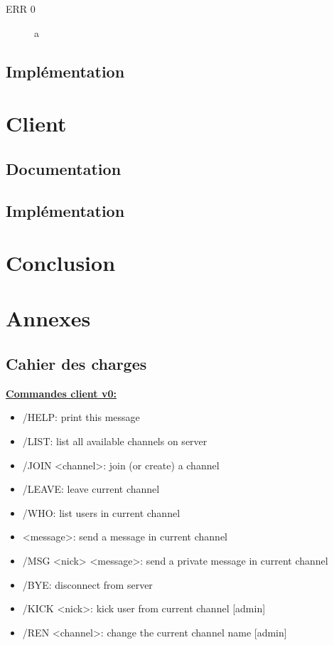 \documentclass[12pt]{article}
\begin{document}
\begin{description}
    \item[ERR 0] a
    \\
\end{description}


\subsection{Implémentation}


\section{Client}

\subsection{Documentation}

\subsection{Implémentation}



\section{Conclusion}




\section{Annexes}
\subsection{Cahier des charges}
{\large \textbf{\underline{Commandes client v0:}}}
\begin{itemize}
    \item /HELP: print this message
    \item /LIST: list all available channels on server
    \item /JOIN <channel>: join (or create) a channel
    \item /LEAVE: leave current channel
    \item /WHO: list users in current channel
    \item <message>: send a message in current channel
    \item /MSG <nick> <message>: send a private message in current channel
    \item /BYE: disconnect from server
    \item /KICK <nick>: kick user from current channel [admin]
    \item /REN <channel>: change the current channel name [admin]
\end{itemize}
\end{document}
